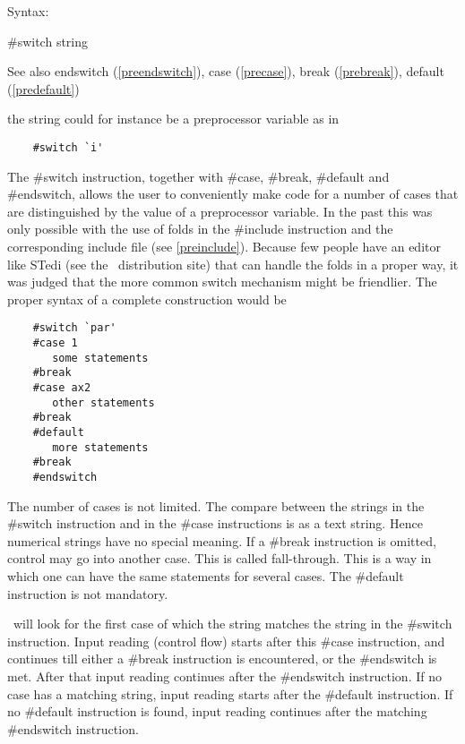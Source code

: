 \noindent Syntax:

\#switch string
 
\noindent See also endswitch (\ref{preendswitch}),
        case (\ref{precase}),
        break (\ref{prebreak}),
        default (\ref{predefault})

\noindent the string could for instance be a preprocessor 
variable as in
\begin{verbatim}
    #switch `i'
\end{verbatim}
The \#switch instruction, together with 
\#case, \#break, \#default 
and \#endswitch, allows the user to conveniently make 
code for a number of cases that are distinguished by the value of a 
preprocessor variable. In the past this was only possible with the use of 
folds in the \#include instruction and the 
corresponding include file (see \ref{preinclude}). 
Because few people have an editor like STedi (see the \FORM\ distribution 
site) that can handle the folds in a proper way, it was judged that the 
more common switch mechanism might be friendlier. The proper syntax of a 
complete construction would be
\begin{verbatim}
    #switch `par'
    #case 1
       some statements
    #break
    #case ax2
       other statements
    #break
    #default
       more statements
    #break
    #endswitch
\end{verbatim}
The number of cases is not limited. The compare between the strings in the 
\#switch instruction and in the \#case instructions is as a text string. 
Hence numerical strings have no special meaning. If a \#break instruction 
is omitted, control may go into another case. This is called 
fall-through. 
This is a way in which one can have the same statements for several cases. 
The \#default instruction is not mandatory.

\FORM\ will look for the first case of which the string matches the string 
in the \#switch instruction. Input reading (control flow) starts after this 
\#case instruction, and continues till either a \#break instruction is 
encountered, or the \#endswitch is met. After that input reading continues 
after the \#endswitch instruction. If no case has a matching string, input 
reading starts after the \#default instruction. If no \#default instruction 
is found, input reading continues after the matching \#endswitch 
instruction.

